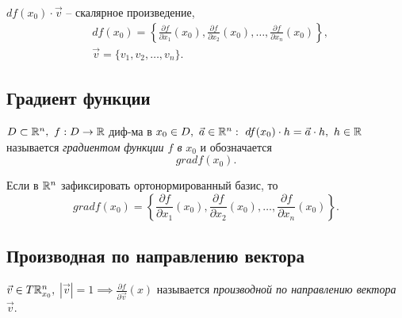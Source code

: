 \begin{note}
    $ df(x_0)\cdot \vec{v} $ -- скалярное произведение,
    \begin{align*}
         & df(x_0) = \left\{\frac{\partial f}{\partial x_1}(x_0), \frac{\partial f}{\partial x_2}(x_0), \ldots, \frac{\partial f}{\partial x_n}(x_0)\right\}, \\
         & \vec{v} = \{v_1,v_2,\ldots,v_n\}.
    \end{align*}
\end{note}

\subsection{Градиент функции}

\begin{definition}
    $ D \subset \mathbb{R}^n, \ f:D\rightarrow \mathbb{R} $ диф-ма в $x_0 \in D, \ \vec{a} \in \mathbb{R}^n: \ df(x_0)\cdot h = \vec{a} \cdot h, \ h \in \mathbb{R}$ называется \emph{градиентом функции $f$ в} $x_0$ и обозначается
    \[
        gradf(x_0).
    \]
\end{definition}

\newpage

\begin{note}
    Если в $\mathbb{R}^n$ зафиксировать ортонормированный базис, то
    \[
        gradf(x_0) = \left\{\frac{\partial f}{\partial x_1}(x_0),\frac{\partial f}{\partial x_2}(x_0),\ldots,\frac{\partial f}{\partial x_n}(x_0)\right\}.
    \]
\end{note}

\subsection{Производная по направлению вектора}

\begin{definition}
    $ \vec{v}\in T\mathbb{R}_{x_0}^n, $ $ |\vec{v}| = 1 \implies \frac{\partial f}{\partial \vec{v}}(x) $ называется \emph{производной по направлению вектора} $ \vec{v} $.
\end{definition}
